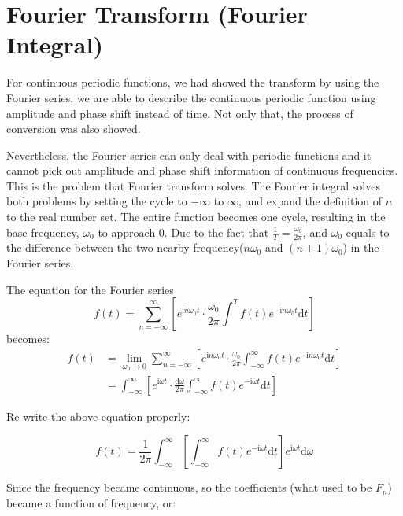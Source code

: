 \section{Fourier Transform (Fourier Integral)}
For continuous periodic functions, we had showed the transform by using the Fourier series, 
we are able to describe the continuous periodic function using amplitude and phase shift instead of time. 
Not only that, the process of conversion was also showed. 

Nevertheless, the Fourier series can only deal with periodic functions and 
it cannot pick out amplitude and phase shift information of continuous frequencies. 
This is the problem that Fourier transform solves.
The Fourier integral solves both problems by setting the cycle to $-\infty$ to $\infty$, 
and expand the definition of $n$ to the real number set. 
The entire function becomes one cycle, resulting in the base frequency, 
$\omega_0$ to approach $0$. Due to the fact that $\frac{1}{T}=\frac{\omega_0}{2\pi}$, 
and $\omega_0$ equals to the difference between the two nearby frequency($n\omega_0$ and $(n+1)\omega_0$) 
in the Fourier series. 

The equation for the Fourier series
$$
    f(t) 
    = \sum_{n=-\infty}^{\infty} \left[ e^{\mathrm{i}n\omega_0t} \cdot
    \frac{\omega_0}{2\pi}\int^{T} f(t)e^{-\mathrm{i}n\omega_0t} \mathrm{d}t\right]
$$
becomes:
$$\begin{aligned}
    f(t) 
    &= \lim_{\omega_0 \to 0} \sum_{n=-\infty}^{\infty} \left[ e^{\mathrm{i}n\omega_0 t} \cdot
    \frac{\omega_0}{2\pi}\int_{-\infty}^{\infty} f(t) e^{-\mathrm{i}n\omega_0 t} \mathrm{d}t \right]   \\
    &= \int_{-\infty}^{\infty}  \left[ e^{\mathrm{i}\omega t} \cdot
    \frac{\mathrm{d}\omega}{2\pi}\int_{-\infty}^{\infty} f(t) e^{-\mathrm{i}\omega t} \mathrm{d}t \right] 
\end{aligned}$$

Re-write the above equation properly:

\begin{equation}
    f(t) 
    = \frac{1}{2\pi} \int_{-\infty}^{\infty} \left[ 
    \int_{-\infty}^{\infty} f(t) e^{-\mathrm{i}\omega t} \mathrm{d}t \right] e^{\mathrm{i}\omega t} \mathrm{d}\omega
    \label{equ:fully_expanded_fourier_integral}
\end{equation}

\indent Since the frequency became continuous, so the coefficients (what used to be $F_n$) 
became a function of frequency, or:

